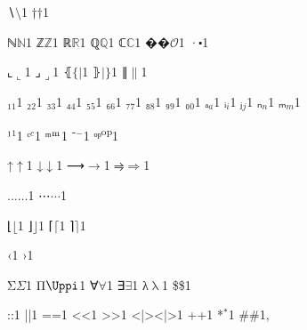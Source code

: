 {{∖}{{\color{symbolcolor}\ensuremath{\setminus}}}1
{†}{{\color{symbolcolor}\ensuremath{\dag}}}1

{ℕ}{{\ensuremath{\mathbb{N}}}}1
{ℤ}{{\ensuremath{\mathbb{Z}}}}1
{ℝ}{{\ensuremath{\mathbb{R}}}}1
{ℚ}{{\ensuremath{\mathbb{Q}}}}1
{ℂ}{{\ensuremath{\mathbb{C}}}}1
{��}{{\ensuremath{\mathcal{O}}}}1
{·}{{\color{symbolcolor}\ensuremath{\centerdot}}}1

{⌞}{{\ensuremath{\llcorner}}}1
{⌟}{{\ensuremath{\lrcorner}}}1
{⦃}{{\ensuremath{\{\!|}}}1
{⦄}{{\ensuremath{|\!\}}}}1
{∥}{{\ensuremath{\|}}}1

{₁}{{\ensuremath{_1}}}1
{₂}{{\ensuremath{_2}}}1
{₃}{{\ensuremath{_3}}}1
{₄}{{\ensuremath{_4}}}1
{₅}{{\ensuremath{_5}}}1
{₆}{{\ensuremath{_6}}}1
{₇}{{\ensuremath{_7}}}1
{₈}{{\ensuremath{_8}}}1
{₉}{{\ensuremath{_9}}}1
{₀}{{\ensuremath{_0}}}1
{ₐ}{{\ensuremath{_a}}}1
{ᵢ}{{\ensuremath{_i}}}1
{ⱼ}{{\ensuremath{_j}}}1
{ₙ}{{\ensuremath{_n}}}1
{ₘ}{{\ensuremath{_m}}}1

{¹}{{\ensuremath{^1}}}1
{ᶜ}{{\color{symbolcolor}\ensuremath{^c}}}1
{ᵐ}{{\color{symbolcolor}\ensuremath{\textsuperscript{m}}}}1
{⁻}{{\ensuremath{^{-}}}}1
{ᵒᵖ}{{\color{symbolcolor}\textsuperscript{op}}}1

{↑}{{\color{symbolcolor}\ensuremath{\uparrow}}}1
{↓}{{\color{symbolcolor}\ensuremath{\downarrow}}}1
{⟶}{{\color{symbolcolor}\ensuremath{\longrightarrow}}}1
{⥤}{{\color{symbolcolor}\ensuremath{\Rightarrow}}}1

{...}{{\ensuremath{\ldots}}}1
{⋯}{{\color{symbolcolor}\ensuremath{\cdots}}}1

{⌊}{{\ensuremath{\lfloor}}}1
{⌋}{{\ensuremath{\rfloor}}}1
{⌈}{{\ensuremath{\lceil}}}1
{⌉}{{\ensuremath{\rceil}}}1

{‹}{{\guilsinglleft}}1
{›}{{\guilsinglright}}1

{Σ}{{\color{symbolcolor}\ensuremath{\Sigma}}}1
{Π}{{\color{symbolcolor}\ensuremath{\Uppi}}}1 %
{∀}{{\color{symbolcolor}\ensuremath{\forall}}}1
{∃}{{\color{symbolcolor}\ensuremath{\exists}}}1
{λ}{{\color{symbolcolor}\ensuremath{\uplambda}}}1
{\$}{{\color{symbolcolor}\$}}1

{:}{{\color{symbolcolor}:}}1
{|}{{\color{symbolcolor}|}}1
{=}{{\color{symbolcolor}=}}1
{<}{{\color{symbolcolor}<}}1
{>}{{\color{symbolcolor}>}}1
{<|>}{{\color{symbolcolor}<|>}}1
{+}{{\color{symbolcolor}+}}1
{*}{{\color{symbolcolor}\ensuremath{{}^{*}}}}1
{\#}{{\color{keywordcolor}\#}}1, %

}
